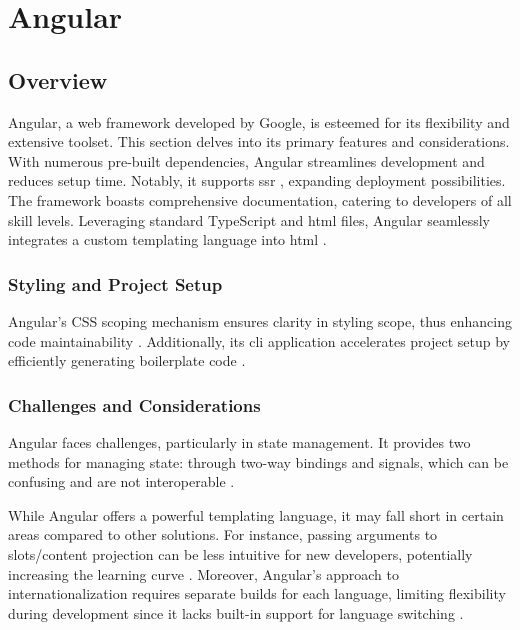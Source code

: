 \section{Angular}
\label{sec:angular}

\subsection{Overview}
\label{subsec:angular:overview}

Angular, a web \gls{framework} developed by Google, is esteemed for its flexibility and extensive toolset. This section delves into its primary features and considerations. With numerous pre-built dependencies, Angular streamlines development and reduces setup time. Notably, it supports \acrfull{ssr} \cite{angulardev:ssr}, expanding deployment possibilities. The \gls{framework} boasts comprehensive documentation, catering to developers of all skill levels. Leveraging standard TypeScript and \acrshort{html} files, Angular seamlessly integrates a custom templating language into \acrshort{html} \cite{angulardev:template_syntax}.

\subsubsection{Styling and Project Setup}

Angular's CSS scoping mechanism ensures clarity in styling scope, thus enhancing code maintainability \cite{angulardev:styling_components}. Additionally, its \acrshort{cli} application accelerates project setup by efficiently generating boilerplate code \cite{angulardev:cli}.

\subsubsection{Challenges and Considerations}
\label{subsec:angular:challenges}

Angular faces challenges, particularly in state management. It provides two methods for managing state: through two-way bindings and signals, which can be confusing and are not interoperable \cite{angulardev:managing_dynamic_data, angulardev:signals}.

While Angular offers a powerful templating language, it may fall short in certain areas compared to other solutions. For instance, passing arguments to slots/content projection can be less intuitive for new developers, potentially increasing the learning curve \cite{angulardev:ng_container}. Moreover, Angular's approach to internationalization requires separate builds for each language, limiting flexibility during development since it lacks built-in support for language switching \cite{angulardev:i18n}.


